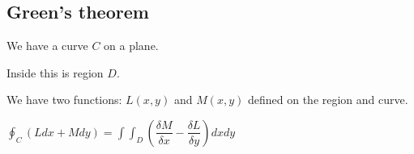 
\subsection{Green's theorem}

We have a curve \(C\) on a plane.

Inside this is region \(D\).

We have two functions: \(L(x,y)\) and \(M(x,y)\) defined on the region and curve.

\(\oint_C (L dx + M dy)=\int \int_D (\dfrac{\delta M}{\delta x}-\dfrac{\delta L}{\delta y})dx dy\)


